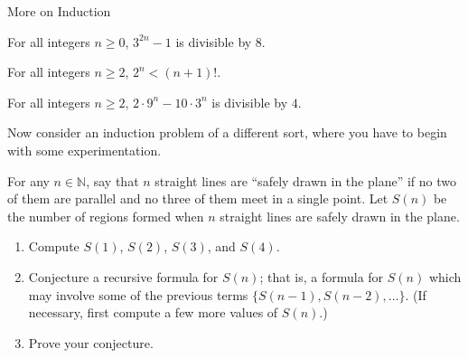 \begin{section}{More on Induction}
\begin{theorem}
For all integers $n \ge 0$, $3^{2n}-1$ is divisible by $8$.
\end{theorem}

\begin{theorem}
For all integers $n \ge 2$, $2^n < (n+1)!$.
\end{theorem}

\begin{theorem}
For all integers $n \ge 2$, $2\cdot 9^n - 10 \cdot 3^n$ is divisible by $4$.
\end{theorem}

Now consider an induction problem of a different sort, where you have to begin with some experimentation.

\begin{problem}
For any $n \in \mathbb{N}$, say that $n$ straight lines are ``safely drawn in the plane'' if no two of them are parallel and no three of them meet in a single point. Let $S(n)$ be the number of regions formed when $n$ straight lines are safely drawn in the plane.
\begin{enumerate}[label=\textrm{(\alph*)}]
\item Compute $S(1)$, $S(2)$, $S(3)$, and $S(4)$.
\item Conjecture a recursive formula for $S(n)$; that is, a formula for $S(n)$ which may involve some of the previous terms $\{S(n-1), S(n-2), \ldots\}$. (If necessary, first compute a few more values of $S(n)$.)
\item Prove your conjecture.
\end{enumerate}
\end{problem}


\end{section}
